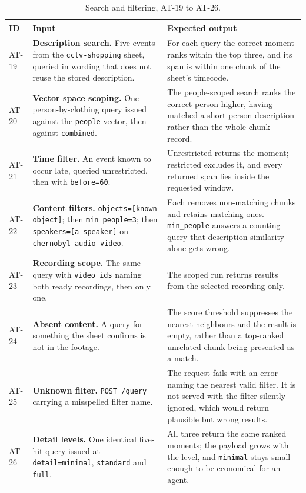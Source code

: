 \documentclass[11pt,a4paper]{article}
\begin{document}
\begin{table}[htbp]
\centering
\scriptsize
\begin{tabularx}{\textwidth}{@{}L{0.85cm}XX@{}}
\toprule
\textbf{ID} & \textbf{Input} & \textbf{Expected output} \\
\midrule
AT-19 & \textbf{Description search.} Five events from the \texttt{cctv-shopping} sheet,
queried in wording that does not reuse the stored description. &
For each query the correct moment ranks within the top three, and its span is within one
chunk of the sheet's timecode. \\
AT-20 & \textbf{Vector space scoping.} One person-by-clothing query issued against the
\texttt{people} vector, then against \texttt{combined}. &
The people-scoped search ranks the correct person higher, having matched a short person
description rather than the whole chunk record. \\
AT-21 & \textbf{Time filter.} An event known to occur late, queried unrestricted, then with
\texttt{before=60}. &
Unrestricted returns the moment; restricted excludes it, and every returned span lies
inside the requested window. \\
AT-22 & \textbf{Content filters.} \texttt{objects=[known object]}; then
\texttt{min\_people=3}; then \texttt{speakers=[a speaker]} on
\texttt{chernobyl-audio-video}. &
Each removes non-matching chunks and retains matching ones. \texttt{min\_people} answers a
counting query that description similarity alone gets wrong. \\
AT-23 & \textbf{Recording scope.} The same query with \texttt{video\_ids} naming both ready
recordings, then only one. &
The scoped run returns results from the selected recording only. \\
AT-24 & \textbf{Absent content.} A query for something the sheet confirms is not in the
footage. &
The score threshold suppresses the nearest neighbours and the result is empty, rather than
a top-ranked unrelated chunk being presented as a match. \\
AT-25 & \textbf{Unknown filter.} \texttt{POST /query} carrying a misspelled filter name. &
The request fails with an error naming the nearest valid filter. It is not served with the
filter silently ignored, which would return plausible but wrong results. \\
AT-26 & \textbf{Detail levels.} One identical five-hit query issued at
\texttt{detail=minimal}, \texttt{standard} and \texttt{full}. &
All three return the same ranked moments; the payload grows with the level, and
\texttt{minimal} stays small enough to be economical for an agent. \\
\bottomrule
\end{tabularx}
\caption{Search and filtering, AT-19 to AT-26.}
\end{table}
\end{document}
